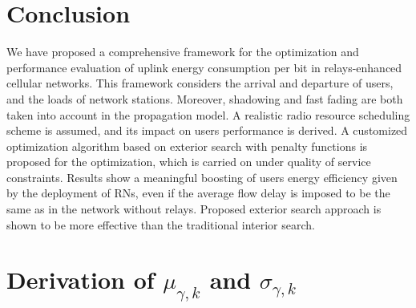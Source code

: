 \documentclass[draftcls,onecolumn]{IEEEtran}
\theoremstyle{plain}
\theoremstyle{definition}
\begin{document}
 


\section{Conclusion}\label{conclusions}



We have proposed a comprehensive framework for the optimization and performance evaluation of uplink energy consumption per bit in relays-enhanced cellular networks. This framework considers the arrival and departure of users, and the loads of network stations. Moreover, shadowing and fast fading are both taken into account in the propagation model. A realistic radio resource scheduling scheme is assumed, and its impact on users performance is derived. A customized optimization algorithm based on exterior search with penalty functions is proposed for the optimization, which is carried on under quality of service constraints. Results show a meaningful boosting of users energy efficiency given by the deployment of RNs, even if the average flow delay is imposed to be the same as in the network without relays. Proposed exterior search approach is shown to be more effective than the traditional interior search.  
\appendices


\section{Derivation of $\mu_{\gamma,k}$ and $\sigma_{\gamma,k}$}\label{appendix:momentmatch}
\end{document}
